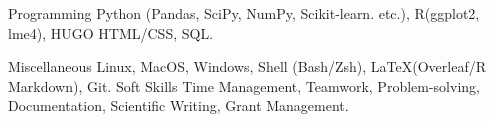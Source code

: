 

\begin{cvskills}

  \cvskill
    {Programming} %
    {Python (Pandas, SciPy, NumPy, Scikit‑learn. etc.), R(ggplot2, lme4), HUGO HTML/CSS, SQL.} %

  \cvskill
    {Miscellaneous} %
    {Linux, MacOS, Windows, Shell (Bash/Zsh), \LaTeX (Overleaf/R Markdown), Git.} %
  \cvskill
    {Soft Skills} %
    {Time Management, Teamwork, Problem-solving, Documentation, Scientific Writing, Grant Management.} %

\end{cvskills}
